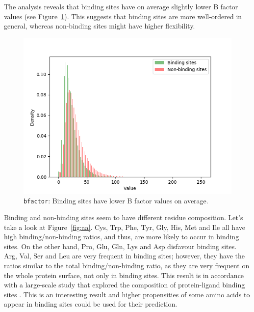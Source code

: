 The analysis reveals that binding sites have on average slightly lower B factor values (see Figure~\ref{fig:bfactor}). This suggests that binding sites are more well-ordered in general, whereas non-binding sites might have higher flexibility.

\begin{figure}[!htbp]
\centering
\includegraphics[width=0.7\linewidth]{../img/bfactor_hist.png}
\caption{\texttt{bfactor}: Binding sites have lower B factor values on average.}
\label{fig:bfactor}
\end{figure}

Binding and non-binding sites seem to have different residue composition. Let's take a look at Figure~\ref{fig:aa}. Cys, Trp, Phe, Tyr, Gly, His, Met and Ile all have high binding/non-binding ratios, and thus, are more likely to occur in binding sites. On the other hand, Pro, Glu, Gln, Lys and Asp disfavour binding sites. Arg, Val, Ser and Leu are very frequent in binding sites; however, they have the ratios similar to the total binding/non-binding ratio, as they are very frequent on the whole protein surface, not only in binding sites. This result is in accordance with a large-scale study that explored the composition of protein-ligand binding sites \cite{lbscomposition}. 
This is an interesting result and higher propensities of some amino acids to appear in binding sites could be used for their prediction.


